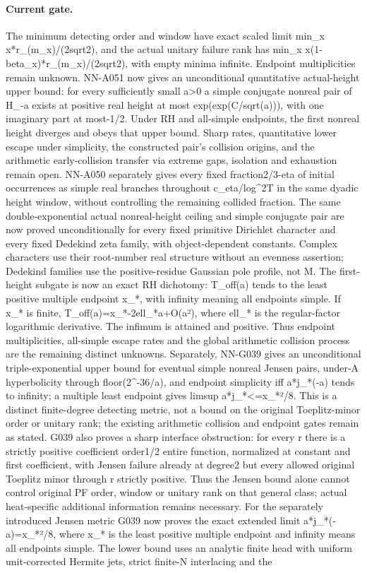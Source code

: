 \paragraph{Current gate.} The minimum detecting order and window have exact scaled limit min\_x x*r\_(m\_x)/(2sqrt2), and the actual unitary failure rank has min\_x x(1-beta\_x)*r\_(m\_x)/(2sqrt2), with empty minima infinite. Endpoint multiplicities remain unknown. NN-A051 now gives an unconditional quantitative actual-height upper bound: for every sufficiently small a>0 a simple conjugate nonreal pair of H\_-a exists at positive real height at most exp(exp(C/sqrt(a))), with one imaginary part at most-1/2. Under RH and all-simple endpoints, the first nonreal height diverges and obeys that upper bound. Sharp rates, quantitative lower escape under simplicity, the constructed pair's collision origins, and the arithmetic early-collision transfer via extreme gaps, isolation and exhaustion remain open. NN-A050 separately gives every fixed fraction2/3-eta of initial occurrences as simple real branches throughout c\_eta/log\textasciicircum{}2T in the same dyadic height window, without controlling the remaining collided fraction. The same double-exponential actual nonreal-height ceiling and simple conjugate pair are now proved unconditionally for every fixed primitive Dirichlet character and every fixed Dedekind zeta family, with object-dependent constants. Complex characters use their root-number real structure without an evenness assertion; Dedekind families use the positive-residue Gaussian pole profile, not M. The first-height subgate is now an exact RH dichotomy: T\_off(a) tends to the least positive multiple endpoint x\_*, with infinity meaning all endpoints simple. If x\_* is finite, T\_off(a)=x\_*-2ell\_*a+O(a²), where ell\_* is the regular-factor logarithmic derivative. The infimum is attained and positive. Thus endpoint multiplicities, all-simple escape rates and the global arithmetic collision process are the remaining distinct unknowns. Separately, NN-G039 gives an unconditional triple-exponential upper bound for eventual simple nonreal Jensen pairs, under-A hyperbolicity through floor(2\textasciicircum{}-36/a), and endpoint simplicity iff a*j\_*(-a) tends to infinity; a multiple least endpoint gives limsup a*j\_*<=x\_*²/8. This is a distinct finite-degree detecting metric, not a bound on the original Toeplitz-minor order or unitary rank; the existing arithmetic collision and endpoint gates remain as stated. G039 also proves a sharp interface obstruction: for every r there is a strictly positive coefficient order1/2 entire function, normalized at constant and first coefficient, with Jensen failure already at degree2 but every allowed original Toeplitz minor through r strictly positive. Thus the Jensen bound alone cannot control original PF order, window or unitary rank on that general class; actual heat-specific additional information remains necessary. For the separately introduced Jensen metric G039 now proves the exact extended limit a*j\_*(-a)=x\_*²/8, where x\_* is the least positive multiple endpoint and infinity means all endpoints simple. The lower bound uses an analytic finite head with uniform unit-corrected Hermite jets, strict finite-N interlacing and the 
